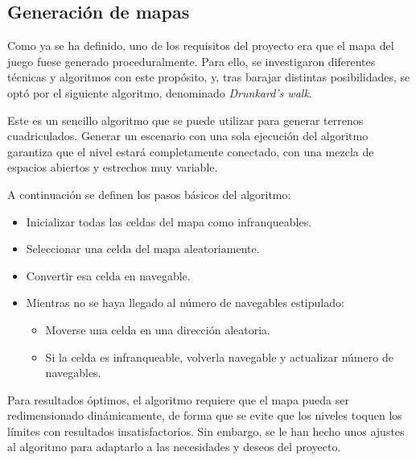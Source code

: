 	\subsection{Generación de mapas}

		Como ya se ha definido, uno de los requisitos del proyecto era que el mapa del juego fuese generado proceduralmente. Para ello, se investigaron diferentes técnicas y algoritmos con este propósito, y, tras barajar distintas posibilidades, se optó por el siguiente algoritmo, denominado \textit{Drunkard's walk}.

		Este es un sencillo algoritmo que se puede utilizar para generar terrenos cuadriculados. Generar un escenario con una sola ejecución del algoritmo garantiza que el nivel estará completamente conectado, con una mezcla de espacios abiertos y estrechos muy variable.

		A continuación se definen los pasos básicos del algoritmo:

		\begin{itemize}

			\item Inicializar todas las celdas del mapa como infranqueables.

			\item Seleccionar una celda del mapa aleatoriamente.

			\item Convertir esa celda en navegable.

			\item Mientras no se haya llegado al número de navegables estipulado:

			\begin{itemize}

				\item Moverse una celda en una dirección aleatoria.

				\item Si la celda es infranqueable, volverla navegable y actualizar número de navegables.

			\end{itemize}

		\end{itemize}

		Para resultados óptimos, el algoritmo requiere que el mapa pueda ser redimensionado dinámicamente, de forma que se evite que los niveles toquen los límites con resultados insatisfactorios. Sin embargo, se le han hecho unos ajustes al algoritmo para adaptarlo a las necesidades y deseos del proyecto.

